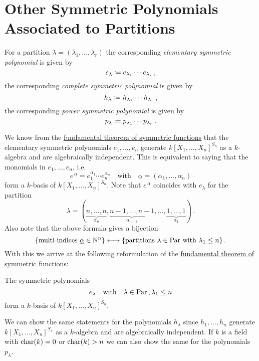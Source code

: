 \section{Other Symmetric Polynomials Associated to Partitions}


\begin{definition}
  For a partition $\lambda = (\lambda_1, \dotsc, \lambda_r)$ the corresponding \emph{elementary symmetric polynomial} is given by
  \[
              e_\lambda
    \coloneqq  e_{\lambda_1} \dotsm e_{\lambda_r} \,,
  \]
  the corresponding \emph{complete symmetric polynomial} is given by
  \[
              h_\lambda
    \coloneqq  h_{\lambda_1} \dotsm h_{\lambda_r} \,,
  \]
  the corresponding \emph{power symmetric polynomial} is given by
  \[
              p_\lambda
    \coloneqq  p_{\lambda_1} \dotsm p_{\lambda_r} \,.
  \]
\end{definition}


\begin{fluff}
  We know from the \hyperref[theorem: fundamental theorem of symmetric functions]{fundamental theorem of symmetric functions} that the elementary symmetric polynomials $e_1, \dotsc, e_n$ generate $k[X_1, \dotsc, X_n]^{S_n}$ as a $k$-algebra and are algebraically independent. This is equivalent to saying that the monomials in $e_1, \dotsc, e_n$, i.e.\
  \[
      e^{\,\underline{\alpha}}
    = e_1^{\alpha_1} \dotsm e_n^{\alpha_n}
    \quad\text{with}\quad
      \underline{\alpha}
    = (\alpha_1, \dotsc, \alpha_n)
  \]
  form a $k$-basis of $k[X_1, \dotsc, X_n]^{S_n}$.
  Note that $e^{\,\underline{\alpha}}$ coincides with $e_\lambda$ for the partition
  \[
    \lambda
  = (
      \underbrace{n, \dotsc, n}_{\alpha_n},
      \underbrace{n-1, \dotsc, n-1}_{\alpha_{n-1}},
      \dotsc,
      \underbrace{1, \dotsc, 1}_{\alpha_1}
    ) \,.
  \]
  Also note that the above formula gives a bijection
  \[
    \{ \text{multi-indices $\underline{\alpha} \in \mathbb{N}^n$} \}
    \longleftrightarrow
    \{ \text{partitions $\lambda \in \operatorname{Par}$ with $\lambda_1 \leq n$} \} \,.
  \]
  With this we arrive at the following reformulation of the \hyperref[theorem: fundamental theorem of symmetric functions]{fundamental theorem of symmetric functions}:
\end{fluff}


\begin{corollary}
  The symmetric polynomials
  \[
      e_\lambda
    \quad\text{with}\quad
      \lambda \in \operatorname{Par} \,,
      \lambda_1 \leq n
  \]
  form a $k$-basis of $k[X_1, \dotsc, X_n]^{S_n}$.
\end{corollary}


\begin{remark}
  We can show the same statements for the polynomials $h_\lambda$ since $h_1, \dotsc, h_n$ generate $k[X_1, \dotsc, X_n]^{S_n}$ as a $k$-algebra and are algebraically independent.
  If $k$ is a field with $\operatorname{char}(k) = 0$ or $\operatorname{char}(k) > n$ we can also show the same for the polynomials $p_\lambda$.
\end{remark}






